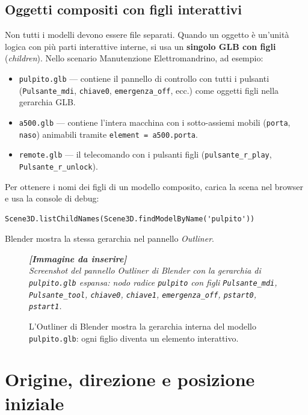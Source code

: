 ﻿\documentclass[a4paper,12pt,oneside]{book}
\newcommand{\kw}[1]{\texttt{\color{keycolor}#1}}
\newcommand{\file}[1]{\texttt{#1}}
\newcommand{\imgph}[2]{%
  \begin{tcolorbox}[colback=cvtlightblue!30,colframe=cvtblue!40,%
    width=#1,halign=center,valign=center,height=5cm,boxrule=0.5pt,arc=3pt]%
    \textcolor{cvtgray}{\itshape\footnotesize\textbf{[Immagine da inserire]}\\[3pt]#2}%
  \end{tcolorbox}}
\begin{document}
\subsection{Oggetti compositi con figli interattivi}

Non tutti i modelli devono essere file separati. Quando un oggetto è
un'unità logica con più parti interattive interne, si usa un
\textbf{singolo GLB con figli} (\emph{children}). Nello scenario
Manutenzione Elettromandrino, ad esempio:

\begin{itemize}
  \item \file{pulpito.glb} --- contiene il pannello di controllo con
        tutti i pulsanti (\texttt{Pulsante\_mdi}, \texttt{chiave0},
        \texttt{emergenza\_off}, ecc.) come oggetti figli nella gerarchia
        GLB.
  \item \file{a500.glb} --- contiene l'intera macchina con i
        sotto-assiemi mobili (\texttt{porta}, \texttt{naso}) animabili
        tramite \kw{element = a500.porta}.
  \item \file{remote.glb} --- il telecomando con i pulsanti figli
        (\texttt{pulsante\_r\_play}, \texttt{Pulsante\_r\_unlock}).
\end{itemize}

\begin{notablu}
Per ottenere i nomi dei figli di un modello composito, carica la scena
nel browser e usa la console di debug:
\begin{lstlisting}
Scene3D.listChildNames(Scene3D.findModelByName('pulpito'))
\end{lstlisting}
Blender mostra la stessa gerarchia nel pannello \emph{Outliner}.
\end{notablu}

\begin{figure}[H]
  \centering
  \imgph{11cm}{Screenshot del pannello \emph{Outliner} di Blender con la gerarchia di \file{pulpito.glb} espansa: nodo radice \texttt{pulpito} con figli \texttt{Pulsante\_mdi}, \texttt{Pulsante\_tool}, \texttt{chiave0}, \texttt{chiave1}, \texttt{emergenza\_off}, \texttt{pstart0}, \texttt{pstart1}.}
  \caption{L'Outliner di Blender mostra la gerarchia interna del modello \file{pulpito.glb}: ogni figlio diventa un elemento interattivo.}
  \label{fig:blender-outliner}
\end{figure}

\section{Origine, direzione e posizione iniziale}
\end{document}
